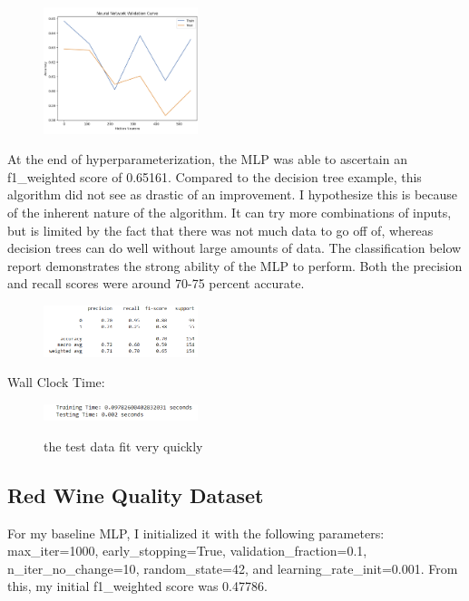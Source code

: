 \documentclass[conference]{IEEEtran}
\begin{document}
\begin{figure}[H]
    \centering
    \includegraphics[width=0.40\textwidth]{PIMA Indian Diabetes Graphs/Neural Nets/nn val.png}
    \label{fig:enter-label}
\end{figure}

At the end of hyperparameterization, the MLP was able to ascertain an f1\_weighted score of 0.65161. Compared to the decision tree example, this algorithm did not see as drastic of an improvement. I hypothesize this is because of the inherent nature of the algorithm. It can try more combinations of inputs, but is limited by the fact that there was not much data to go off of, whereas decision trees can do well without large amounts of data. The classification below report demonstrates the strong ability of the MLP to perform. Both the precision and recall scores were around 70-75 percent accurate.

\begin{figure}[H]
    \centering
    \includegraphics[width=0.40\textwidth]{PIMA Indian Diabetes Graphs/Neural Nets/nn cr.png}
    \label{fig:enter-label}
\end{figure}

Wall Clock Time: 
\begin{figure}[H]
    \centering
    \includegraphics[width=0.40\textwidth]{PIMA Indian Diabetes Graphs/Neural Nets/nn wct.png}
    \label{fig:enter-label}
    \caption{the test data fit very quickly}
\end{figure}

\subsection{\textbf{Red Wine Quality Dataset}}\label{BB}
For my baseline MLP, I initialized it with the following parameters: {max\_iter=1000}, {early\_stopping=True}, {validation\_fraction=0.1}, {n\_iter\_no\_change=10},  {random\_state=42}, and {learning\_rate\_init=0.001}. From this, my initial f1\_weighted score was 0.47786.
\end{document}
